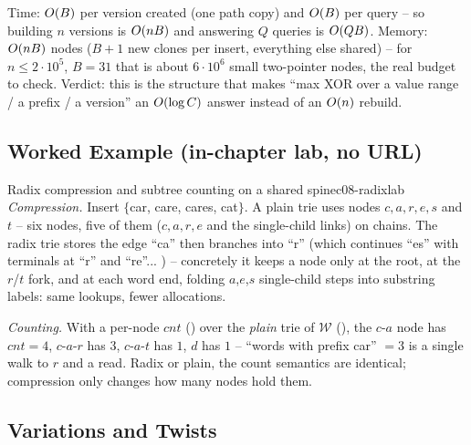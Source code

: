 \begin{complexitybox}
Time: $O(B)$ per version created (one path copy) and $O(B)$ per query -- so building $n$ versions
is $O(nB)$ and answering $Q$ queries is $O(Q B)$. Memory: $O(nB)$ nodes ($B{+}1$ new clones
per insert, everything else shared) -- for $n\le 2\cdot 10^5$, $B=31$ that is about $6\cdot 10^{6}$ small
two-pointer nodes, the real budget to check. Verdict: this is the structure that makes ``max XOR over a
value range / a prefix / a version'' an $O(\log C)$ answer instead of an $O(n)$ rebuild.
\end{complexitybox}

\subsection{Worked Example (in-chapter lab, no URL)}

\begin{example}{Radix compression and subtree counting on a shared spine}{c08-radixlab}
\emph{Compression.} Insert $\{$car, care, cares, cat$\}$. A plain trie uses nodes
$c,a,r,e,s$ and $t$ -- six nodes, five of them ($c,a,r,e$ and the single-child links) on chains. The
radix trie stores the edge ``ca'' then branches into ``r'' (which continues ``es'' with terminals at
``r'' and ``re''... ) -- concretely it keeps a node only at the root, at the $r$/$t$ fork, and at each
word end, folding $a$,$e$,$s$ single-child steps into substring labels: same lookups, fewer allocations.

\emph{Counting.} With a per-node $\mathit{cnt}$ () over the \emph{plain} trie of
$\mathcal{W}$ (), the $c$-$a$ node has $\mathit{cnt}=4$, $c$-$a$-$r$ has $3$,
$c$-$a$-$t$ has $1$, $d$ has $1$ -- ``words with prefix car'' $=3$ is a single walk to $r$ and a read.
Radix or plain, the count semantics are identical; compression only changes how many nodes hold them.
\end{example}

\subsection{Variations and Twists}

